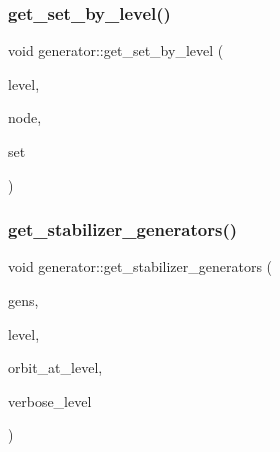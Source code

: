 \mbox{\label{classgenerator_a3012a80d862b42c848b84584389c8594}} 
\subsubsection{\texorpdfstring{get\+\_\+set\+\_\+by\+\_\+level()}{get\_set\_by\_level()}}
{\footnotesize\ttfamily void generator\+::get\+\_\+set\+\_\+by\+\_\+level (\begin{DoxyParamCaption}\item[{\mbox{\hyperlink{galois_8h_a09fddde158a3a20bd2dcadb609de11dc}{I\+NT}}}]{level,  }\item[{\mbox{\hyperlink{galois_8h_a09fddde158a3a20bd2dcadb609de11dc}{I\+NT}}}]{node,  }\item[{\mbox{\hyperlink{galois_8h_a09fddde158a3a20bd2dcadb609de11dc}{I\+NT}} $\ast$}]{set }\end{DoxyParamCaption})}

\mbox{\label{classgenerator_a744da633f741e1aa27701fe9d203d564}} 
\subsubsection{\texorpdfstring{get\+\_\+stabilizer\+\_\+generators()}{get\_stabilizer\_generators()}}
{\footnotesize\ttfamily void generator\+::get\+\_\+stabilizer\+\_\+generators (\begin{DoxyParamCaption}\item[{\mbox{\hyperlink{classstrong__generators}{strong\+\_\+generators}} $\ast$\&}]{gens,  }\item[{\mbox{\hyperlink{galois_8h_a09fddde158a3a20bd2dcadb609de11dc}{I\+NT}}}]{level,  }\item[{\mbox{\hyperlink{galois_8h_a09fddde158a3a20bd2dcadb609de11dc}{I\+NT}}}]{orbit\+\_\+at\+\_\+level,  }\item[{\mbox{\hyperlink{galois_8h_a09fddde158a3a20bd2dcadb609de11dc}{I\+NT}}}]{verbose\+\_\+level }\end{DoxyParamCaption})}

\mbox{\label{classgenerator_a1a1ffde2c62084e556850b8142a9152c}} 
